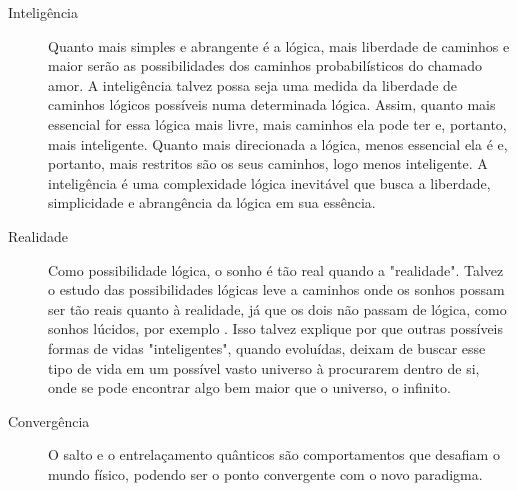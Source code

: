 \begin{description}
	   \item[Inteligência] Quanto mais simples e abrangente é a lógica, mais liberdade de caminhos e maior serão as possibilidades dos caminhos probabilísticos do chamado amor. A inteligência talvez possa seja uma medida da liberdade de caminhos lógicos possíveis numa determinada lógica. Assim, quanto mais essencial for essa lógica mais livre, mais caminhos ela pode ter e, portanto, mais inteligente. Quanto mais direcionada a lógica, menos essencial ela é e, portanto, mais restritos são os seus caminhos, logo menos inteligente. A inteligência é uma complexidade lógica inevitável que busca a liberdade, simplicidade e abrangência da lógica em sua essência.
	   \item[Realidade] Como possibilidade lógica, o sonho é tão real quando a "realidade". Talvez o estudo das possibilidades lógicas leve a caminhos onde os sonhos possam ser tão reais quanto à realidade, já que os dois não passam de lógica, como sonhos lúcidos, por exemplo \cite{ administradores_principio_pareto}. Isso talvez explique por que outras possíveis formas de vidas "inteligentes", quando evoluídas, deixam de buscar esse tipo de vida em um possível vasto universo à procurarem dentro de si, onde se pode encontrar algo bem maior que o universo, o infinito.
	   \item[Convergência] O salto e o entrelaçamento quânticos são comportamentos que desafiam o mundo físico, podendo ser o ponto convergente com o novo paradigma.
	\end{description}